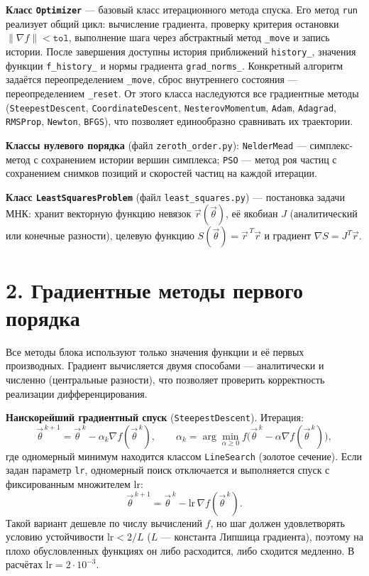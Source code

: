 \documentclass[a4paper]{article}
\newcommand{\subsectiontext}[1]{%
    \section*{\fontsize{13pt}{0pt}\selectfont\textbf{#1}}%
}
\begin{document}
\textbf{Класс \texttt{Optimizer}} — базовый класс итерационного метода спуска. Его метод \texttt{run} реализует общий цикл: вычисление градиента, проверку критерия остановки $\|\nabla f\| < \texttt{tol}$, выполнение шага через абстрактный метод \texttt{\_move} и запись истории. После завершения доступны история приближений \texttt{history\_}, значения функции \texttt{f\_history\_} и нормы градиента \texttt{grad\_norms\_}. Конкретный алгоритм задаётся переопределением \texttt{\_move}, сброс внутреннего состояния — переопределением \texttt{\_reset}. От этого класса наследуются все градиентные методы (\texttt{SteepestDescent}, \texttt{CoordinateDescent}, \texttt{NesterovMomentum}, \texttt{Adam}, \texttt{Adagrad}, \texttt{RMSProp}, \texttt{Newton}, \texttt{BFGS}), что позволяет единообразно сравнивать их траектории.

\textbf{Классы нулевого порядка} (файл \texttt{zeroth\_order.py}): \texttt{NelderMead} — симплекс-метод с сохранением истории вершин симплекса; \texttt{PSO} — метод роя частиц с сохранением снимков позиций и скоростей частиц на каждой итерации.

\textbf{Класс \texttt{LeastSquaresProblem}} (файл \texttt{least\_squares.py}) — постановка задачи МНК: хранит векторную функцию невязок $\vec{r}(\vec{\theta})$, её якобиан $J$ (аналитический или конечные разности), целевую функцию $S(\vec{\theta}) = \vec{r}^{\,T}\vec{r}$ и градиент $\nabla S = J^T \vec{r}$.

\subsectiontext{2. Градиентные методы первого порядка}

Все методы блока используют только значения функции и её первых производных. Градиент вычисляется двумя способами — аналитически и численно (центральные разности), что позволяет проверить корректность реализации дифференцирования.

\textbf{Наискорейший градиентный спуск} (\texttt{SteepestDescent}). Итерация:
\[
    \vec{\theta}^{\,k+1} = \vec{\theta}^{\,k} - \alpha_k \nabla f(\vec{\theta}^{\,k}),
    \qquad
    \alpha_k = \arg\min_{\alpha \ge 0} f\bigl(\vec{\theta}^{\,k} - \alpha \nabla f(\vec{\theta}^{\,k})\bigr),
\]
где одномерный минимум находится классом \texttt{LineSearch} (золотое сечение). Если задан параметр \texttt{lr}, одномерный поиск отключается и выполняется спуск с фиксированным множителем $\text{lr}$:
\[
    \vec{\theta}^{\,k+1} = \vec{\theta}^{\,k} - \text{lr}\, \nabla f(\vec{\theta}^{\,k}).
\]
Такой вариант дешевле по числу вычислений $f$, но шаг должен удовлетворять условию устойчивости $\text{lr} < 2/L$ ($L$ — константа Липшица градиента), поэтому на плохо обусловленных функциях он либо расходится, либо сходится медленно. В расчётах $\text{lr} = 2\cdot10^{-3}$.
\end{document}
